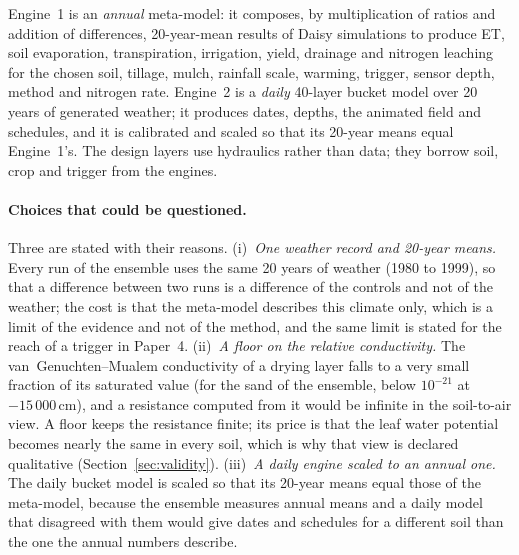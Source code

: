 \documentclass[preprint,12pt]{elsarticle}
\begin{document}
Engine~1 is an \emph{annual} meta-model: it composes, by multiplication of ratios and addition of differences, 20-year-mean results of Daisy simulations to produce ET, soil evaporation, transpiration, irrigation, yield, drainage and nitrogen leaching for the chosen soil, tillage, mulch, rainfall scale, warming, trigger, sensor depth, method and nitrogen rate. Engine~2 is a \emph{daily} 40-layer bucket model over 20 years of generated weather; it produces dates, depths, the animated field and schedules, and it is calibrated and scaled so that its 20-year means equal Engine~1's. The design layers use hydraulics rather than data; they borrow soil, crop and trigger from the engines.

\paragraph{Choices that could be questioned.} Three are stated with their reasons. (i)~\emph{One weather record and 20-year means.} Every run of the ensemble uses the same 20 years of weather (1980 to 1999), so that a difference between two runs is a difference of the controls and not of the weather; the cost is that the meta-model describes this climate only, which is a limit of the evidence and not of the method, and the same limit is stated for the reach of a trigger in Paper~4. (ii)~\emph{A floor on the relative conductivity.} The van~Genuchten--Mualem conductivity of a drying layer falls to a very small fraction of its saturated value (for the sand of the ensemble, below $10^{-21}$ at $-15\,000$\,cm), and a resistance computed from it would be infinite in the soil-to-air view. A floor keeps the resistance finite; its price is that the leaf water potential becomes nearly the same in every soil, which is why that view is declared qualitative (Section~\ref{sec:validity}). (iii)~\emph{A daily engine scaled to an annual one.} The daily bucket model is scaled so that its 20-year means equal those of the meta-model, because the ensemble measures annual means and a daily model that disagreed with them would give dates and schedules for a different soil than the one the annual numbers describe.

\end{document}
